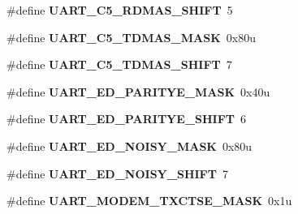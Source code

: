 \begin{DoxyCompactItemize}
\item 
\hypertarget{group___u_a_r_t___register___masks_gab95d268a11167ac6ab4cf41332bf5aa6}{}\#define {\bfseries U\+A\+R\+T\+\_\+\+C5\+\_\+\+R\+D\+M\+A\+S\+\_\+\+S\+H\+I\+F\+T}~5\label{group___u_a_r_t___register___masks_gab95d268a11167ac6ab4cf41332bf5aa6}

\item 
\hypertarget{group___u_a_r_t___register___masks_ga593bf2d9f1d2a222d8cbde7b88aba833}{}\#define {\bfseries U\+A\+R\+T\+\_\+\+C5\+\_\+\+T\+D\+M\+A\+S\+\_\+\+M\+A\+S\+K}~0x80u\label{group___u_a_r_t___register___masks_ga593bf2d9f1d2a222d8cbde7b88aba833}

\item 
\hypertarget{group___u_a_r_t___register___masks_gadf4f03768249772994b3082c369698e7}{}\#define {\bfseries U\+A\+R\+T\+\_\+\+C5\+\_\+\+T\+D\+M\+A\+S\+\_\+\+S\+H\+I\+F\+T}~7\label{group___u_a_r_t___register___masks_gadf4f03768249772994b3082c369698e7}

\item 
\hypertarget{group___u_a_r_t___register___masks_gad2d9046649263c73bfa0e64091c82d45}{}\#define {\bfseries U\+A\+R\+T\+\_\+\+E\+D\+\_\+\+P\+A\+R\+I\+T\+Y\+E\+\_\+\+M\+A\+S\+K}~0x40u\label{group___u_a_r_t___register___masks_gad2d9046649263c73bfa0e64091c82d45}

\item 
\hypertarget{group___u_a_r_t___register___masks_gaed5785f9e519dfa7936d82f4fedb8a83}{}\#define {\bfseries U\+A\+R\+T\+\_\+\+E\+D\+\_\+\+P\+A\+R\+I\+T\+Y\+E\+\_\+\+S\+H\+I\+F\+T}~6\label{group___u_a_r_t___register___masks_gaed5785f9e519dfa7936d82f4fedb8a83}

\item 
\hypertarget{group___u_a_r_t___register___masks_gab5ab58923c23cde1672fc9ae19053696}{}\#define {\bfseries U\+A\+R\+T\+\_\+\+E\+D\+\_\+\+N\+O\+I\+S\+Y\+\_\+\+M\+A\+S\+K}~0x80u\label{group___u_a_r_t___register___masks_gab5ab58923c23cde1672fc9ae19053696}

\item 
\hypertarget{group___u_a_r_t___register___masks_gab366fc1267a46213bc540e93c2603a6c}{}\#define {\bfseries U\+A\+R\+T\+\_\+\+E\+D\+\_\+\+N\+O\+I\+S\+Y\+\_\+\+S\+H\+I\+F\+T}~7\label{group___u_a_r_t___register___masks_gab366fc1267a46213bc540e93c2603a6c}

\item 
\hypertarget{group___u_a_r_t___register___masks_ga00c7ea6d89eec98c2f6cc98651712c00}{}\#define {\bfseries U\+A\+R\+T\+\_\+\+M\+O\+D\+E\+M\+\_\+\+T\+X\+C\+T\+S\+E\+\_\+\+M\+A\+S\+K}~0x1u\label{group___u_a_r_t___register___masks_ga00c7ea6d89eec98c2f6cc98651712c00}


\end{DoxyCompactItemize}
